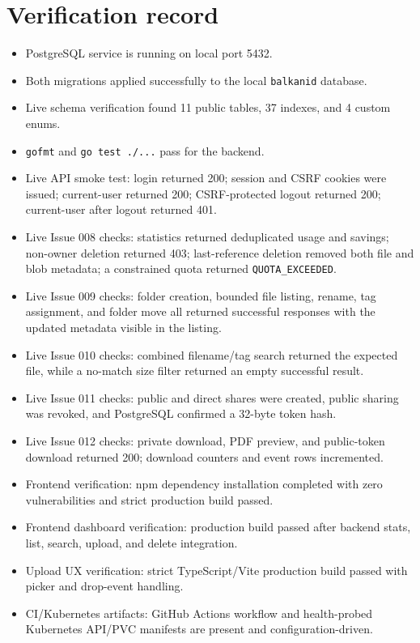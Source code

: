 \documentclass[11pt,a4paper]{article}
\begin{document}
\section{Verification record}
\begin{itemize}[leftmargin=*]
  \item PostgreSQL service is running on local port 5432.
  \item Both migrations applied successfully to the local \texttt{balkanid} database.
  \item Live schema verification found 11 public tables, 37 indexes, and 4 custom enums.
  \item \texttt{gofmt} and \texttt{go test ./...} pass for the backend.
  \item Live API smoke test: login returned 200; session and CSRF cookies were issued; current-user returned 200; CSRF-protected logout returned 200; current-user after logout returned 401.
  \item Live Issue 008 checks: statistics returned deduplicated usage and savings; non-owner deletion returned 403; last-reference deletion removed both file and blob metadata; a constrained quota returned \texttt{QUOTA\_EXCEEDED}.
  \item Live Issue 009 checks: folder creation, bounded file listing, rename, tag assignment, and folder move all returned successful responses with the updated metadata visible in the listing.
  \item Live Issue 010 checks: combined filename/tag search returned the expected file, while a no-match size filter returned an empty successful result.
  \item Live Issue 011 checks: public and direct shares were created, public sharing was revoked, and PostgreSQL confirmed a 32-byte token hash.
  \item Live Issue 012 checks: private download, PDF preview, and public-token download returned 200; download counters and event rows incremented.
  \item Frontend verification: npm dependency installation completed with zero vulnerabilities and strict production build passed.
  \item Frontend dashboard verification: production build passed after backend stats, list, search, upload, and delete integration.
  \item Upload UX verification: strict TypeScript/Vite production build passed with picker and drop-event handling.
  \item CI/Kubernetes artifacts: GitHub Actions workflow and health-probed Kubernetes API/PVC manifests are present and configuration-driven.

\end{itemize}
\end{document}
